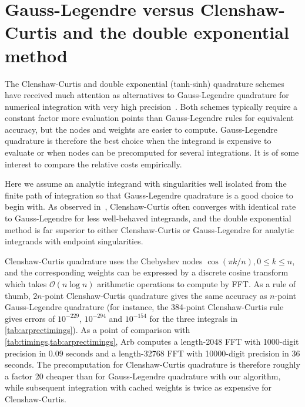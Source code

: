 \documentclass[nohypdvips,review]{siamart0216}
\newcommand{\OO}{\mathcal{O}}
\begin{document}
\section{Gauss-Legendre versus Clenshaw-Curtis and the double exponential method}

\label{sec:vsothers}

The Clenshaw-Curtis and double exponential (tanh-sinh) quadrature schemes
have received much attention as alternatives to Gauss-Legendre
quadrature for numerical integration with very high precision~\cite{takahasi1974double,bailey2011high,trefethen2008gauss}.
Both schemes
typically require a constant factor more evaluation points than Gauss-Legendre rules
for equivalent accuracy, but the nodes and weights are easier to compute.
Gauss-Legendre quadrature is therefore the best choice
when the integrand is expensive to evaluate or when nodes can
be precomputed for several integrations.
It is of some interest to compare the relative costs empirically.

Here we assume an analytic integrand with singularities well isolated from
the finite path of integration so that Gauss-Legendre quadrature is a good
choice to begin with. As observed in~\cite{trefethen2008gauss},
Clenshaw-Curtis often converges with identical rate to Gauss-Legendre for
less well-behaved integrands,
and the double exponential method is far superior to either
Clenshaw-Curtis or Gauss-Legendre for
analytic integrands with endpoint singularities.

Clenshaw-Curtis quadrature uses the Chebyshev nodes
$\cos(\pi k / n), 0 \le k \le n$, and the corresponding weights can be expressed
by a discrete cosine transform which takes $\OO(n \log n)$
arithmetic operations to compute by FFT.
As a rule of thumb, $2n$-point Clenshaw-Curtis quadrature
gives the same accuracy as $n$-point Gauss-Legendre quadrature
(for instance, the 384-point Clenshaw-Curtis rule gives
errors of $10^{-229}$, $10^{-294}$ and $10^{-154}$ for the three
integrals in \cref{tab:arprectimings}).
As a point of comparison with \cref{tab:timings,tab:arprectimings},
Arb computes a length-2048 FFT with 1000-digit precision
in 0.09 seconds and a length-32768 FFT with 10000-digit precision
in 36 seconds.
The precomputation for Clenshaw-Curtis quadrature is therefore
roughly a factor 20 cheaper than for Gauss-Legendre quadrature
with our algorithm, while subsequent integration with
cached weights is twice as expensive for Clenshaw-Curtis.
\end{document}

